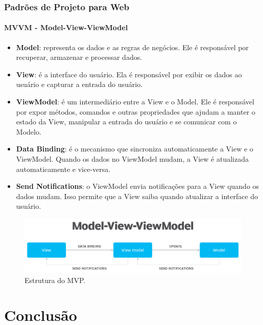\documentclass[
	9pt, %
	t, %
]{beamer}
\begin{document}
\begin{frame}
	\frametitle{Padrões de Projeto para Web}
	\framesubtitle{MVVM - Model-View-ViewModel}

	{\small 
	\begin{itemize}
		\item \textbf{Model}: representa os dados e as regras de negócios. Ele é responsável por recuperar, armazenar e processar dados.
		\item \textbf{View}: é a interface do usuário. Ela é responsável por exibir os dados ao usuário e capturar a entrada do usuário.
		\item \textbf{ViewModel}: é um intermediário entre a View e o Model. Ele é responsável por expor métodos, comandos e outras propriedades que ajudam a manter o estado da View, manipular a entrada do usuário e se comunicar com o Modelo.
		\item \textbf{Data Binding}: é o mecanismo que sincroniza automaticamente a View e o ViewModel. Quando os dados no ViewModel mudam, a View é atualizada automaticamente e vice-versa.
		\item \textbf{Send Notifications}: o ViewModel envia notificações para a View quando os dados mudam. Isso permite que a View saiba quando atualizar a interface do usuário.
	\end{itemize}
	}

	\begin{figure}
		\centering
		\includegraphics[width=0.9\linewidth]{Images/mvvm.png}
		\caption{Estrutura do MVP.}\label{fig:mvvm}
	\end{figure}

\end{frame}

\section{Conclusão}
\end{document}

